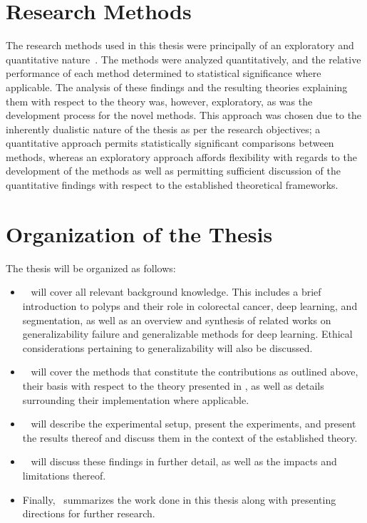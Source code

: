     \section{Research Methods}
    The research methods used in this thesis were principally of an exploratory and quantitative nature~\cite{research_methods}. The methods were analyzed quantitatively, and the relative performance of each method determined to statistical significance where applicable. The analysis of these findings and the resulting theories explaining them with respect to the theory was, however, exploratory, as was the development process for the novel methods. This approach was chosen due to the inherently dualistic nature of the thesis as per the research objectives; a quantitative approach permits statistically significant comparisons between methods, whereas an exploratory approach affords flexibility with regards to the development of the methods as well as permitting sufficient discussion of the quantitative findings with respect to the established theoretical frameworks. 
    
    
    \section{Organization of the Thesis}
    The thesis will be organized as follows:
    \begin{itemize}
        \item ~ will cover all relevant background knowledge. This includes a brief introduction to polyps and their role in colorectal cancer, deep learning, and segmentation, as well as an overview and synthesis of related works on generalizability failure and generalizable methods for deep learning. Ethical considerations pertaining to generalizability will also be discussed.
        \item ~ will cover the methods that constitute the contributions as outlined above, their basis with respect to the theory presented in , as well as details surrounding their implementation where applicable.
        \item ~ will describe the experimental setup, present the experiments, and present the results thereof and discuss them in the context of the established theory.
        \item ~ will discuss these findings in further detail, as well as the impacts and limitations thereof.
        \item Finally,~ summarizes the work done in this thesis along with presenting directions for further research.
    \end{itemize} 